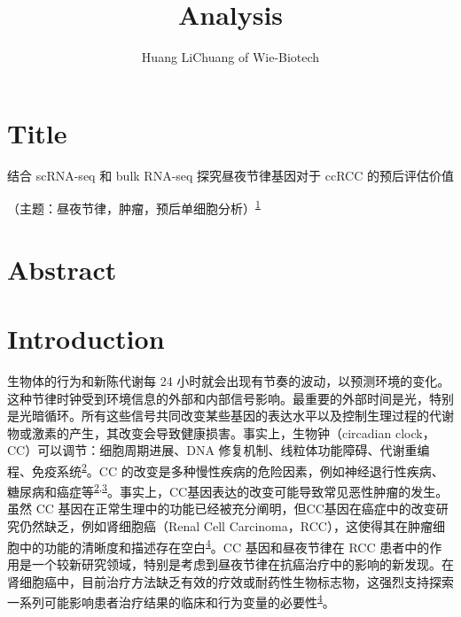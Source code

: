 \documentclass[
]{article}
\title{Analysis}
\author{Huang LiChuang of Wie-Biotech}
\date{}
\begin{document}
\maketitle

{
\setcounter{tocdepth}{3}
\tableofcontents
}
\listoffigures

\listoftables

\hypertarget{title}{%
\section{Title}\label{title}}

结合 scRNA-seq 和 bulk RNA-seq 探究昼夜节律基因对于 ccRCC 的预后评估价值

（主题：昼夜节律，肿瘤，预后单细胞分析）\textsuperscript{\protect\hyperlink{ref-SingleCellTraHeLe2022}{1}}

\hypertarget{abstract}{%
\section{Abstract}\label{abstract}}

\hypertarget{introduction}{%
\section{Introduction}\label{introduction}}

生物体的行为和新陈代谢每 24 小时就会出现有节奏的波动，以预测环境的变化。这种节律时钟受到环境信息的外部和内部信号影响。最重要的外部时间是光，特别是光暗循环。所有这些信号共同改变某些基因的表达水平以及控制生理过程的代谢物或激素的产生，其改变会导致健康损害。事实上，生物钟（circadian clock，CC）可以调节：细胞周期进展、DNA 修复机制、线粒体功能障碍、代谢重编程、免疫系统\textsuperscript{\protect\hyperlink{ref-ChronotherapyAmiama2022}{2}}。CC 的改变是多种慢性疾病的危险因素，例如神经退行性疾病、糖尿病和癌症等\textsuperscript{\protect\hyperlink{ref-ChronotherapyAmiama2022}{2},\protect\hyperlink{ref-CancerAndTheShafi2019}{3}}。事实上，CC基因表达的改变可能导致常见恶性肿瘤的发生。虽然 CC 基因在正常生理中的功能已经被充分阐明，但CC基因在癌症中的改变研究仍然缺乏，例如肾细胞癌（Renal Cell Carcinoma，RCC），这使得其在肿瘤细胞中的功能的清晰度和描述存在空白\textsuperscript{\protect\hyperlink{ref-RoleOfClockGSanton2023}{4}}。CC 基因和昼夜节律在 RCC 患者中的作用是一个较新研究领域，特别是考虑到昼夜节律在抗癌治疗中的影响的新发现。在肾细胞癌中，目前治疗方法缺乏有效的疗效或耐药性生物标志物，这强烈支持探索一系列可能影响患者治疗结果的临床和行为变量的必要性\textsuperscript{\protect\hyperlink{ref-RoleOfClockGSanton2023}{4}}。
\end{document}
